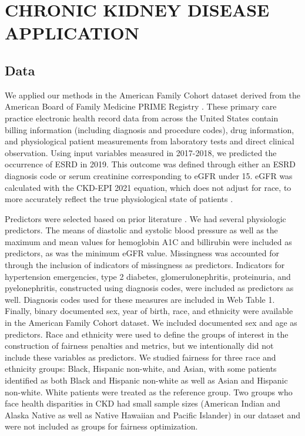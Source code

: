 \documentclass[
  12pt]{article}
\begin{document}
\section{CHRONIC KIDNEY DISEASE APPLICATION}\label{sec-application}

\subsection{Data}\label{data}

We applied our methods in the American Family Cohort dataset derived
from the American Board of Family Medicine PRIME Registry
\citep{phillips_prime_2017, stanford_center_for_population_health_sciences_afc_2024}.
These primary care practice electronic health record data from across
the United States contain billing information (including diagnosis and
procedure codes), drug information, and physiological patient
measurements from laboratory tests and direct clinical observation.
Using input variables measured in 2017-2018, we predicted the occurrence
of ESRD in 2019. This outcome was defined through either an ESRD
diagnosis code or serum creatinine corresponding to eGFR under 15. eGFR
was calculated with the CKD-EPI 2021 equation, which does not adjust for
race, to more accurately reflect the true physiological state of
patients \citep{inker_new_2021}.

Predictors were selected based on prior literature
\citep{segal_machine_2020, inoguchi_simplified_2022, su_machine_2022, wang_towards_2022}.
We had several physiologic predictors. The means of diastolic and
systolic blood pressure as well as the maximum and mean values for
hemoglobin A1C and billirubin were included as predictors, as was the
minimum eGFR value. Missingness was accounted for through the inclusion
of indicators of missingness as predictors. Indicators for hypertension
emergencies, type 2 diabetes, glomerulonephritis, proteinuria, and
pyelonephritis, constructed using diagnosis codes, were included as
predictors as well. Diagnosis codes used for these measures are included
in Web Table 1. Finally, binary documented sex, year of birth, race, and
ethnicity were available in the American Family Cohort dataset. We
included documented sex and age as predictors. Race and ethnicity were
used to define the groups of interest in the construction of fairness
penalties and metrics, but we intentionally did not include these
variables as predictors. We studied fairness for three race and
ethnicity groups: Black, Hispanic non-white, and Asian, with some
patients identified as both Black and Hispanic non-white as well as
Asian and Hispanic non-white. White patients were treated as the
reference group. Two groups who face health disparities in CKD had small
sample sizes (American Indian and Alaska Native as well as Native
Hawaiian and Pacific Islander) in our dataset and were not included as
groups for fairness optimization.
\end{document}
